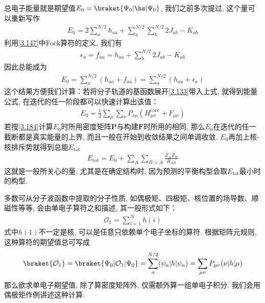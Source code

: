 总电子能量就是期望值$E_0 = \braket{\Psi_0|\hs|\Psi_0}$, 
我们之前多次提过, 
这个量可以重新写作
\begin{align}
	E_0 =2\sum_a^{N/2}h_{aa} + \sum_a^{N/2}\sum_b^{N/2}2J_{ab}-K_{ab}
\end{align}
利用\autoref{3.147}中Fock算符的定义, 
我们有
\begin{align}
	\epsilon_a = f_{aa} = h_{aa} + \sum_b^{N/2}2J_{ab} - K_{ab}
\end{align}
因此总能成为
\begin{align}
	\label{3.183}
	E_0 = \sum_{a}^{N/2}(h_{aa}+f_{aa}) = \sum_{a}^{N/2}(h_{aa}+\epsilon_a)
\end{align}
这个结果方便我们计算：若将分子轨道的基函数展开\autoref{3.133}带入上式, 
就得到能量公式, 
在迭代的任一阶段都可以快速计算出该值：
\begin{align}
	\label{3.184}
	E_0 = \frac{1}{2}\sum_\mu\sum_\nu P_{\nu\mu}(H_{\mu\nu}^\mathrm{core}+F_{\mu\nu})
\end{align}
若按\autoref{3.184}计算$E_0$时所用密度矩阵$\mathbf{P}$与构建$\mathbf{F}$时所用的相同, 
那么$E_0$在迭代的任一截断都是真实能量的上界, 
而且一般在开始到收敛结果之间单调收敛. 
$E_0$再加上核-核排斥势就得到总能$E_\mathrm{tot}$
\begin{align}
	\label{3.185}
	E_\mathrm{tot} = E_0 + \sum_{A}\sum_{B>A}\frac{Z_AZ_B}{R_{AB}}
\end{align}
这就是一般所关心的量, 
尤其是在确定结构时, 
因为预测的平衡构型会取$E_\mathrm{tot}$最小时的构型.


多数可从分子波函数中提取的分子性质, 
如偶极矩、四极矩、核位置的场导数、顺磁性等等, 
会由单电子算符之和描述, 
其一般形式如下：
\begin{align}
	\mathcal{O}_1 = \sum_{i=1}^{N}h(i)
\end{align}
式中$h(1)$不一定是核\ha, 
可以是任意只依赖单个电子坐标的算符. 
根据矩阵元规则, 
这种算符的期望值总可写成
\begin{align}
	\label{3.187}
	\braket{\mathcal{O}_1} = \braket{\Psi_0|\mathcal{O}_1|\Psi_0} = \sum_{a}^{N/2}(\psi_a|h|\psi_a) = \sum_{\mu\nu}P_{\mu\nu}(\nu|h|\mu)
\end{align}
那么欲求单电子期望值, 
除了算密度矩阵外, 
仅需额外算一组单电子积分. 
我们会用偶极矩作例讲述这种计算. 


